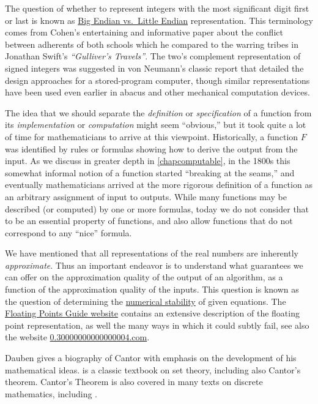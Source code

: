 The question of whether to represent integers with the most significant
digit first or last is known as
\href{https://betterexplained.com/articles/understanding-big-and-little-endian-byte-order/}{Big
Endian vs.~Little Endian} representation. This terminology comes from
Cohen's \cite{cohen1981holy} entertaining and informative paper about
the conflict between adherents of both schools which he compared to the
warring tribes in Jonathan Swift's \emph{``Gulliver's Travels''}. The
two's complement representation of signed integers was suggested in von
Neumann's classic report \cite{vonNeumann45} that detailed the design
approaches for a stored-program computer, though similar representations
have been used even earlier in abacus and other mechanical computation
devices.

The idea that we should separate the \emph{definition} or
\emph{specification} of a function from its \emph{implementation} or
\emph{computation} might seem ``obvious,'' but it took quite a lot of
time for mathematicians to arrive at this viewpoint. Historically, a
function \(F\) was identified by rules or formulas showing how to derive
the output from the input. As we discuss in greater depth in
\cref{chapcomputable}, in the 1800s this somewhat informal notion of a
function started ``breaking at the seams,'' and eventually
mathematicians arrived at the more rigorous definition of a function as
an arbitrary assignment of input to outputs. While many functions may be
described (or computed) by one or more formulas, today we do not
consider that to be an essential property of functions, and also allow
functions that do not correspond to any ``nice'' formula.

We have mentioned that all representations of the real numbers are
inherently \emph{approximate}. Thus an important endeavor is to
understand what guarantees we can offer on the approximation quality of
the output of an algorithm, as a function of the approximation quality
of the inputs. This question is known as the question of determining the
\href{https://en.wikipedia.org/wiki/Numerical_stability}{numerical
stability} of given equations. The
\href{https://floating-point-gui.de/}{Floating Points Guide website}
contains an extensive description of the floating point representation,
as well the many ways in which it could subtly fail, see also the
website \href{http://0.30000000000000004.com/}{0.30000000000000004.com}.

Dauben \cite{Dauben90cantor} gives a biography of Cantor with emphasis
on the development of his mathematical ideas. \cite{halmos1960naive} is
a classic textbook on set theory, including also Cantor's theorem.
Cantor's Theorem is also covered in many texts on discrete mathematics,
including \cite{LehmanLeightonMeyer , LewisZax19 }.

